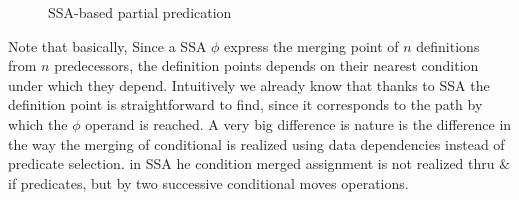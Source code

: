 \begin{figure}
\caption{SSA-based partial predication}
\label{fig:nest_ssa}
\end{figure}
Note that basically, Since a SSA $\phi$ express the merging point of $n$ definitions from $n$ predecessors, the definition points depends on their nearest condition under which they depend. Intuitively we already know that thanks to SSA the definition point is straightforward to find, since it corresponds to the path by which the $\phi$ operand is reached. 
A very big difference is nature is the difference in the way the merging of conditional is realized using data dependencies instead of predicate selection. in SSA he condition merged assignment is not realized thru $\&$ if predicates, but by two successive conditional moves operations.

